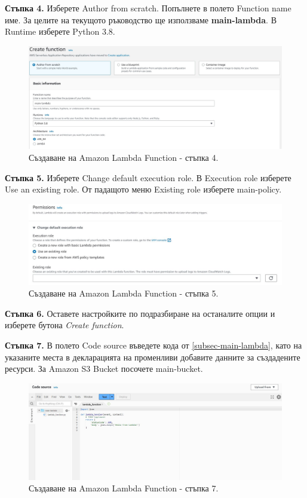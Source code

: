 \documentclass[12pt]{article}
\begin{document}
\noindent\textbf{Стъпка 4.} Изберете Author from scratch. Попълнете в полето Function name име. За целите на текущото ръководство ще използваме \textbf{main-lambda}. В Runtime изберете Python 3.8.
\begin{figure}[h!]
\centering
    \includegraphics[scale=0.4]{instructions/lambda/4.JPG}
  \caption{Създаване на Amazon Lambda Function - стъпка 4.}
\end{figure}

\noindent\textbf{Стъпка 5.} Изберете Change default execution role. В Execution role изберете Use an existing role. От падащото меню Existing role изберете main-policy. 
\begin{figure}[h!]
\centering
    \includegraphics[scale=0.55]{instructions/lambda/5.JPG}
  \caption{Създаване на Amazon Lambda Function - стъпка 5.}
\end{figure}

\noindent\textbf{Стъпка 6.} Оставете настройките по подразбиране на останалите опции и изберете бутона \textit{Create function}.

\noindent\textbf{Стъпка 7.} В полето Code source въведете кода от \ref{subsec-main-lambda}, като на указаните места в декларацията на променливи добавите данните за създадените ресурси. За Amazon S3 Bucket посочете main-bucket.
\begin{figure}[h!]
\centering
    \includegraphics[scale=0.4]{instructions/lambda/7.JPG}
  \caption{Създаване на Amazon Lambda Function - стъпка 7.}
\end{figure}
\end{document}
